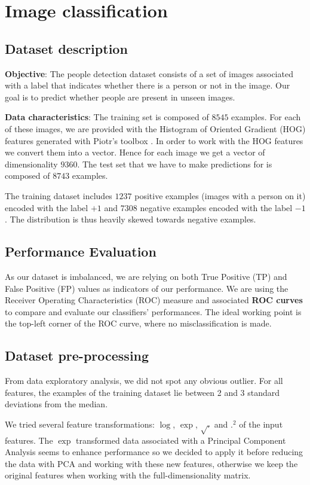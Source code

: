 \documentclass[10pt,a4paper]{article}
\begin{document}
\section{Image classification}

  \subsection{Dataset description}
  \textbf{Objective}: The people detection dataset consists of a set of images associated with a label that indicates whether there is a person or not in the image. Our goal is to predict whether people are present in unseen images.

  \textbf{Data characteristics}: The training set is composed of $8545$ examples. For each of these images, we are provided with the Histogram of Oriented Gradient (HOG) features generated with Piotr's toolbox \cite{piotrtoolbox}. In order to work with the HOG features we convert them into a vector. Hence for each image we get a vector of dimensionality $9360$. The test set that we have to make predictions for is composed of $8743$ examples.

  The training dataset includes $1237$ positive examples (images with a person on it) encoded with the label $+1$ and $7308$ negative examples encoded with the label $-1$. The distribution is thus heavily skewed towards negative examples.

  \subsection{Performance Evaluation}
  As our dataset is imbalanced, we are relying on both True Positive (TP) and False Positive (FP) values as indicators of our performance. We are using the Receiver Operating Characteristics (ROC) measure and associated \textbf{ROC curves} \cite{rocanalysis} to compare and evaluate our classifiers' performances. The ideal working point is the top-left corner of the ROC curve, where no misclassification is made.

  \subsection{Dataset pre-processing}
  From data exploratory analysis, we did not spot any obvious outlier. For all features, the examples of the training dataset lie between 2 and 3 standard deviations from the median.

  We tried several feature transformations: $\log$, $\exp$, $\sqrt{.}$ and $.^2$ of the input features. The $\exp$ transformed data associated with a Principal Component Analysis seems to enhance performance so we decided to apply it before reducing the data with PCA and working with these new features, otherwise we keep the original features when working with the full-dimensionality matrix.
\end{document}
